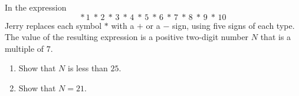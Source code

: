 In the expression
\[
*\,1\;*\,2\;*\,3\;*\,4\;*\,5\;*\,6\;*\,7\;*\,8\;*\,9\;*\,10
\]
Jerry replaces each symbol $*$ with a $+$ or a $-$ sign, using five signs of each type. The value of the resulting expression is a positive two-digit number $N$ that is a multiple of $7$.
\begin{enumerate}
\item[(a)] Show that $N$ is less than $25$.
\item[(b)] Show that $N=21$.
\end{enumerate}
